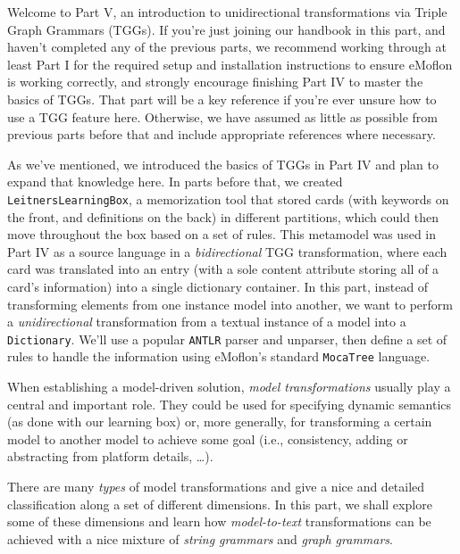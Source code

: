 \genHeader

Welcome to Part V, an introduction to unidirectional transformations via Triple Graph Grammars (TGGs). If you're just joining our handbook in
this part, and haven't completed any of the previous parts, we recommend working through at least Part I for the required setup and installation instructions to
ensure eMoflon is working correctly, and strongly encourage finishing Part IV to master the basics of TGGs. That part will be a key reference if you're ever
unsure how to use a TGG feature here. Otherwise, we have assumed as little as possible from previous parts before that and include appropriate
references where necessary.

As we've mentioned, we introduced the basics of TGGs in Part IV and plan to expand that knowledge here. In parts before that, we created
\texttt{LeitnersLearningBox}, a memorization tool that stored cards (with keywords on the front, and definitions on the back) in different partitions, which
could then move throughout the box based on a set of rules. This metamodel was used in Part IV as a source language in a
\emph{bidirectional}  TGG transformation, where each card was translated into an entry (with a sole content attribute
storing all of a card's information) into a single dictionary container. In this part, instead of transforming elements from one instance model into another, we
want to perform a \emph{unidirectional} transformation from a textual instance of a model into a
\texttt{Dictionary}. We'll use a popular \texttt{ANTLR} parser and unparser, then define a set of rules to handle the information using eMoflon's standard
\texttt{MocaTree} language.

When establishing a model-driven solution, \emph{model transformations} usually play a central and important role. They could be used for specifying dynamic
semantics (as done with our learning box) or, more generally, for transforming a certain model to another model to achieve some goal (i.e., consistency, adding
or abstracting from platform details, \ldots).

There are many \emph{types} of model transformations and \cite{CH03,Mens_Gorp_2006} give a nice and detailed classification along a set of different dimensions.
In this part, we shall explore some of these dimensions and learn how \emph{model-to-text} transformations can be achieved with a nice mixture of \emph{string
grammars} and \emph{graph grammars}.


